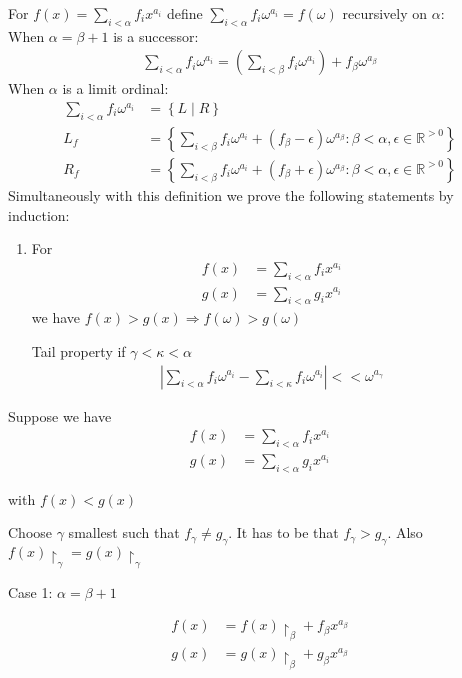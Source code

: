 \documentclass{article}
\newcommand{\paren}[1]{\left( #1 \right)}
\newcommand{\curly}[1]{\left\{ #1 \right\}}
\newcommand{\R}{\mathbb{R}}
\newcommand{\w}{\omega}
\newcommand{\midr}[1]{\restriction_{#1}}
\begin{document}
For $f(x) = \sum_{i < \alpha} f_i x^{a_i}$ define $\sum_{i < \alpha} f_i \w^{a_i} = f(\omega)$ recursively on $\alpha$: \\ 
When $\alpha = \beta + 1$ is a successor:
\begin{align*}
	\sum_{i < \alpha} f_i \w^{a_i} = \paren{\sum_{i < \beta} f_i \omega^{a_i}} + f_\beta \w^{a_\beta}
\end{align*}
When $\alpha$ is a limit ordinal:
\begin{align*}
	\sum_{i < \alpha} f_i \w^{a_i} &= \curly{L \mid R} \\
  L_f &= \curly{\sum_{i < \beta} f_i \w^{a_i} + (f_\beta - \epsilon) \w^{a_\beta}
	\colon \beta < \alpha, \epsilon \in \R^{>0}} \\
  R_f &= \curly{\sum_{i < \beta} f_i \w^{a_i} + (f_\beta + \epsilon) \w^{a_\beta}
	\colon \beta < \alpha, \epsilon \in \R^{>0}}
\end{align*}
Simultaneously with this definition we prove the following statements by induction:
\begin{enumerate}
	\item For
	\begin{align*}
		f(x) &= \sum_{i < \alpha} f_i x^{a_i} \\
		g(x) &= \sum_{i < \alpha} g_i x^{a_i}
	\end{align*}
	we have $f(x) > g(x) \Rightarrow f(\w) > g(\w)$
	\item [Tail property] if $\gamma < \kappa < \alpha$
	\begin{align*}
		\left| \sum_{i < \alpha} f_i \w^{a_i} - \sum_{i < \kappa} f_i \w^{a_i} \right| << \w^{a_\gamma}
	\end{align*}
\end{enumerate}

Suppose we have
\begin{align*}
  f(x) &= \sum_{i < \alpha} f_i x^{a_i} \\
  g(x) &= \sum_{i < \alpha} g_i x^{a_i}
\end{align*}

with $f(x) < g(x)$

Choose $\gamma$ smallest such that $f_\gamma \neq g_\gamma$.
It has to be that $f_\gamma > g_\gamma$. Also $f(x)\midr\gamma = g(x)\midr\gamma$

Case 1: $\alpha = \beta + 1$

\begin{align*}
  f(x) &= f(x)\midr\beta + f_\beta x^{a_\beta}\\
  g(x) &= g(x)\midr\beta + g_\beta x^{a_\beta}
\end{align*}
\end{document}
